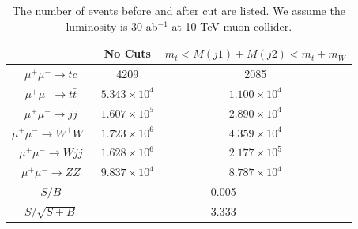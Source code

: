 \documentclass[a4paper,11pt]{article}
\begin{document}
\begin{center}
\begin{table}
  \begin{center}
  \begin{tabular}{c|c|c}
  \hline
  &  No Cuts   &    $m_t<M(j1)+M(j2)<m_t+m_W$       \\
  \hline
  $\mu^+\mu^-\to tc$     &   4209     &     2085      \\
  $\mu^+\mu^-\to t\bar{t}$     &   $5.343\times{10^4}$      &     $1.100\times{10^4}$     \\
  $\mu^+\mu^-\to jj$     &   $1.607\times{10^5}$      &    $2.890\times{10^4}$        \\
  $\mu^+\mu^-\to W^+W^-$  & $1.723\times{10^6}$   & $4.359\times{10^4}$  \\
  $\mu^+\mu^-\to Wjj$  & $1.628\times{10^6}$   &  $2.177\times{10^5}$ \\
  $\mu^+\mu^-\to ZZ$  & $9.837\times{10^4}$  &  $8.787\times{10^4}$ \\
  \hline
  $S/B$      &  \multicolumn{2}{c}{0.005}  \\
  $S/\sqrt{S+B}$      &  \multicolumn{2}{c}{3.333}  \\
  \hline
  \end{tabular}
  \end{center}
  \caption{The number of events before and after cut are listed. We assume the luminosity is $30$ ab$^{-1}$ at 10 TeV muon collider. \label{table:cut}}
\end{table}
\end{center}
\end{document}
